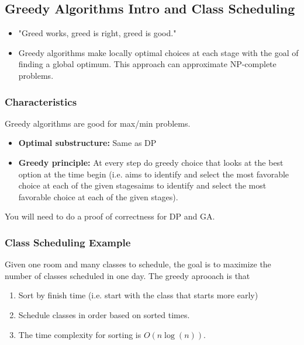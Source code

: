 \subsection{Greedy Algorithms Intro and Class Scheduling}

\begin{intuition}
    \begin{itemize}
        \item "Greed works, greed is right, greed is good." 
        \item Greedy algorithms make locally optimal choices at each stage with the goal of finding a global optimum. This approach can approximate NP-complete problems.
    \end{itemize}
\end{intuition}

\subsubsection{Characteristics}
\begin{definition}
        Greedy algorithms are good for max/min problems. 
        \begin{itemize}
            \item \textbf{Optimal substructure:} Same as DP
            \item \textbf{Greedy principle:} At every step do greedy choice that looks at the best option at the time begin (i.e. aims to identify and select the most favorable choice at each of the given stagesaims to identify and select the most favorable choice at each of the given stages). 
        \end{itemize}
\end{definition}

\begin{warning}
    You will need to do a proof of correctness for DP and GA.
\end{warning}

\subsubsection{Class Scheduling Example}
\begin{example}
    Given one room and many classes to schedule, the goal is to maximize the number of classes scheduled in one day. The greedy aprooach is that
    \begin{enumerate}
        \item Sort by finish time (i.e. start with the class that starts more early)
        \item Schedule classes in order based on sorted times.
        \item The time complexity for sorting is $O(n\log(n))$.
    \end{enumerate}

\end{example}

